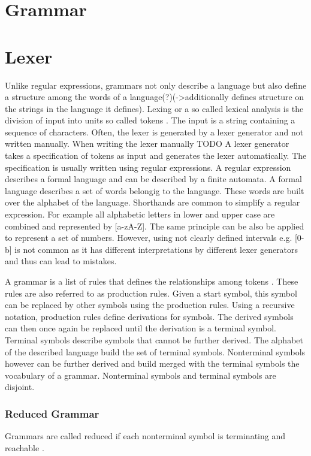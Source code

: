 \section{Grammar}\label{sec:BackgroundGrammar}
\section{Lexer}\label{sec:BackgroundLexer}

Unlike regular expressions, grammars not only describe a language but also define a structure among the words of a language(?)(->additionally defines structure on the strings in the language it defines).
Lexing or a so called lexical analysis is the division of input into units so called tokens \cite{LexYacc.1992}. 
The input is a string containing a sequence of characters. 
Often, the lexer is generated by a lexer generator and not written manually.
When writing the lexer manually TODO
A lexer generator takes a specification of tokens as input and generates the lexer automatically. 
The specification is usually written using regular expressions. 
A regular expression describes a formal language and can be described by a finite automata.
A formal language describes a set of words belongig to the language.
These words are built over the alphabet of the language.
Shorthands are common to simplify a regular expression.
For example all alphabetic letters in lower and upper case are combined and represented by [a-zA-Z].
The same principle can be also be applied to represent a set of numbers.
However, using not clearly defined intervals e.g. [0-b] is not common as it has different interpretations by different lexer generators and thus can lead to mistakes. \cite{Mogensen.2017}

A grammar is a list of rules that defines the relationships among tokens \cite{LexYacc.1992}.
These rules are also referred to as production rules.
Given a start symbol, this symbol can be replaced by other symbols using the production rules.
Using a recursive notation, production rules define derivations for symbols. The derived symbols can then once again be replaced until the derivation is a terminal symbol.  
Terminal symbols describe symbols that cannot be further derived. The alphabet of the described language build the set of terminal symbols.
Nonterminal symbols however can be further derived and build  merged with the terminal symbols the vocabulary of a grammar. Nonterminal symbols and terminal symbols are disjoint. 

\subsubsection{Reduced Grammar}
Grammars are called reduced if each nonterminal symbol is terminating and reachable \cite{Cremers75}.
 
